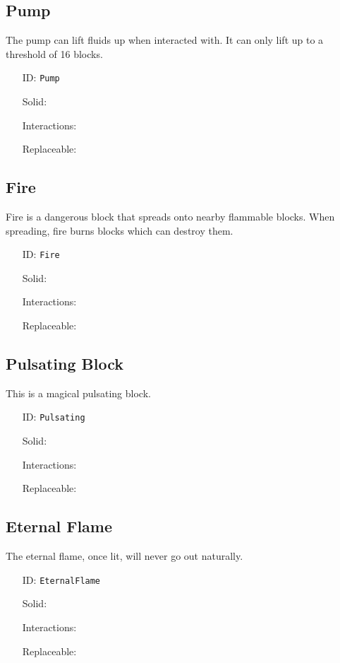\subsection{Pump}\label{subsec:blocks_pump}
The pump can lift fluids up when interacted with.
It can only lift up to a threshold of 16 blocks.
\newline
\begin{itemize}[nosep]
    \item[ID:] \texttt{Pump}
    \item[Solid:]  \Checkmark \item[Interactions:]  \Checkmark \item[Replaceable:]  \XSolidBrush
\end{itemize}

\subsection{Fire}\label{subsec:blocks_fire}
Fire is a dangerous block that spreads onto nearby flammable blocks.
When spreading, fire burns blocks which can destroy them.
\newline
\begin{itemize}[nosep]
    \item[ID:] \texttt{Fire}
    \item[Solid:]  \XSolidBrush \item[Interactions:]  \XSolidBrush \item[Replaceable:]  \Checkmark
\end{itemize}

\subsection{Pulsating Block}\label{subsec:blocks_pulsating block}
This is a magical pulsating block.
\newline
\begin{itemize}[nosep]
    \item[ID:] \texttt{Pulsating}
    \item[Solid:]  \Checkmark \item[Interactions:]  \Checkmark \item[Replaceable:]  \XSolidBrush
\end{itemize}

\subsection{Eternal Flame}\label{subsec:blocks_eternal flame}
The eternal flame, once lit, will never go out naturally.
\newline
\begin{itemize}[nosep]
    \item[ID:] \texttt{EternalFlame}
    \item[Solid:]  \Checkmark \item[Interactions:]  \XSolidBrush \item[Replaceable:]  \XSolidBrush
\end{itemize}

